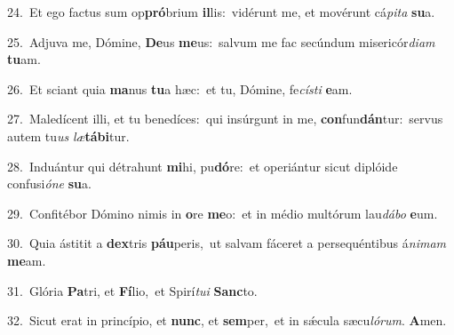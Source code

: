 {\numbfont\textcolor{\numbcolor}{24.}}~Et ego factus sum op\-\textbf{pró}\-brium \textbf{il}\-lis:~\star vidérunt me, et movérunt cá\-\textit{pi}\-\textit{ta} \textbf{su}\-a.\par
{\numbfont\textcolor{\numbcolor}{25.}}~Adjuva me, Dómine, \textbf{De}\-us \textbf{me}\-us:~\star salvum me fac secúndum misericór\-\textit{di}\-\textit{am} \textbf{tu}\-am.\par
{\numbfont\textcolor{\numbcolor}{26.}}~Et sciant quia \textbf{ma}\-nus \textbf{tu}\-a hæc:~\star et tu, Dómine, fe\-\textit{cís}\-\textit{ti} \textbf{e}\-am.\par
{\numbfont\textcolor{\numbcolor}{27.}}~Maledícent illi, et tu benedíces:~\dagger qui insúrgunt in me, \textbf{con}\-fun\-\textbf{dán}\-tur:~\star servus autem tu\textit{us} \textit{læ}\-\textbf{tá}\textbf{bi}tur.\par
{\numbfont\textcolor{\numbcolor}{28.}}~Induántur qui détrahunt \textbf{mi}\-hi, pu\-\textbf{dó}\-re:~\star et operiántur sicut diplóide confusi\-\textit{ó}\-\textit{ne} \textbf{su}\-a.\par
{\numbfont\textcolor{\numbcolor}{29.}}~Confitébor Dómino nimis in \textbf{o}\-re \textbf{me}\-o:~\star et in médio multórum lau\-\textit{dá}\-\textit{bo} \textbf{e}\-um.\par
{\numbfont\textcolor{\numbcolor}{30.}}~Quia ástitit a \textbf{dex}\-tris \textbf{páu}\-peris,~\star ut salvam fáceret a persequéntibus á\-\textit{ni}\-\textit{mam} \textbf{me}\-am.\par
{\numbfont\textcolor{\numbcolor}{31.}}~Glória \textbf{Pa}\-tri, et \textbf{Fí}\-lio,~\star et Spirí\-\textit{tu}\-\textit{i} \textbf{Sanc}\-to.\par
{\numbfont\textcolor{\numbcolor}{32.}}~Sicut erat in princípio, et \textbf{nunc}\-, et \textbf{sem}\-per,~\star et in sǽcula sæcu\-\textit{ló}\-\textit{rum}. \textbf{A}\-men.\par
